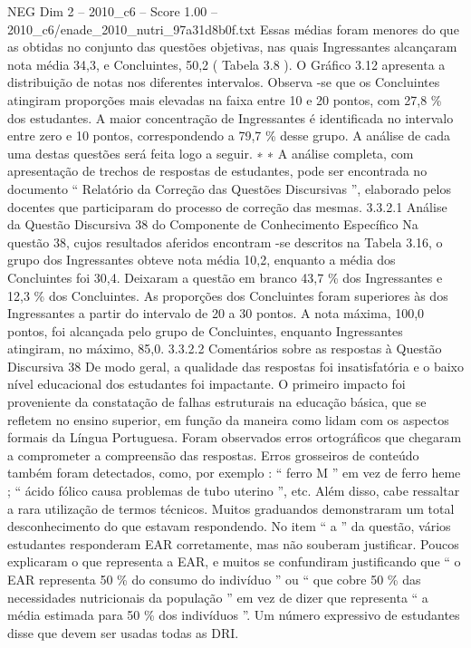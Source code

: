 \begin{textsample}{NEG Dim 2 – 2010\_c6 – Score 1.00 – 2010\_c6/enade\_2010\_nutri\_97a31d8b0f.txt}
Essas médias foram menores do que as obtidas no conjunto das questões objetivas, nas quais Ingressantes alcançaram nota média 34,3, e Concluintes, 50,2 ( Tabela 3.8 ).
O Gráfico 3.12 apresenta a distribuição de notas nos diferentes intervalos.
Observa -se que os Concluintes atingiram proporções mais elevadas na faixa entre 10 e 20 pontos, com 27,8 \% dos estudantes.
A maior concentração de Ingressantes é identificada no intervalo entre zero e 10 pontos, correspondendo a 79,7 \% desse grupo.
A análise de cada uma destas questões será feita logo a seguir. ∗ ∗ A análise completa, com apresentação de trechos de respostas de estudantes, pode ser encontrada no documento “ Relatório da Correção das Questões Discursivas ”, elaborado pelos docentes que participaram do processo de correção das mesmas. 3.3.2.1 Análise da Questão Discursiva 38 do Componente de Conhecimento Específico Na questão 38, cujos resultados aferidos encontram -se descritos na Tabela 3.16, o grupo dos Ingressantes obteve nota média 10,2, enquanto a média dos Concluintes foi 30,4.
Deixaram a questão em branco 43,7 \% dos Ingressantes e 12,3 \% dos Concluintes.
As proporções dos Concluintes foram superiores às dos Ingressantes a partir do intervalo de 20 a 30 pontos.
A nota máxima, 100,0 pontos, foi alcançada pelo grupo de Concluintes, enquanto Ingressantes atingiram, no máximo, 85,0. 3.3.2.2 Comentários sobre as respostas à Questão Discursiva 38 De modo geral, a qualidade das respostas foi insatisfatória e o baixo nível educacional dos estudantes foi impactante.
O primeiro impacto foi proveniente da constatação de falhas estruturais na educação básica, que se refletem no ensino superior, em função da maneira como lidam com os aspectos formais da Língua Portuguesa.
Foram observados erros ortográficos que chegaram a comprometer a compreensão das respostas.
Erros grosseiros de conteúdo também foram detectados, como, por exemplo : “ ferro M ” em vez de ferro heme ; “ ácido fólico causa problemas de tubo uterino ”, etc.
Além disso, cabe ressaltar a rara utilização de termos técnicos.
Muitos graduandos demonstraram um total desconhecimento do que estavam respondendo.
No item “ a ” da questão, vários estudantes responderam EAR corretamente, mas não souberam justificar.
Poucos explicaram o que representa a EAR, e muitos se confundiram justificando que “ o EAR representa 50 \% do consumo do indivíduo ” ou “ que cobre 50 \% das necessidades nutricionais da população ” em vez de dizer que representa “ a média estimada para 50 \% dos indivíduos ”.
Um número expressivo de estudantes disse que devem ser usadas todas as DRI.

\end{textsample}
